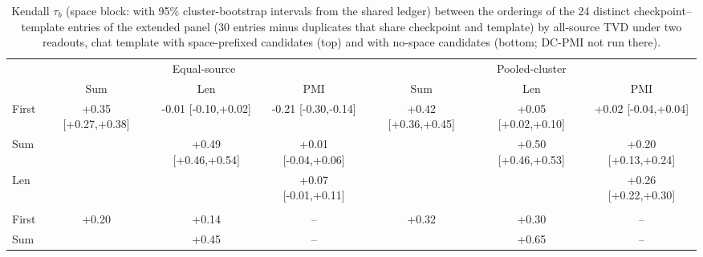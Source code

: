 \begin{table}[t]
\centering\scriptsize
\setlength{\tabcolsep}{2.5pt}
\begin{tabular}{@{}lccc@{\hspace{8pt}}ccc@{}}
\toprule
& \multicolumn{3}{c}{Equal-source} & \multicolumn{3}{c}{Pooled-cluster} \\
\cmidrule(lr){2-4}\cmidrule(l){5-7}
& Sum & Len & PMI & Sum & Len & PMI \\
\midrule
First & +0.35 [+0.27,+0.38] & -0.01 [-0.10,+0.02] & -0.21 [-0.30,-0.14] & +0.42 [+0.36,+0.45] & +0.05 [+0.02,+0.10] & +0.02 [-0.04,+0.04] \\
Sum &  & +0.49 [+0.46,+0.54] & +0.01 [-0.04,+0.06] &  & +0.50 [+0.46,+0.53] & +0.20 [+0.13,+0.24] \\
Len &  &  & +0.07 [-0.01,+0.11] &  &  & +0.26 [+0.22,+0.30] \\
\addlinespace[2pt]\multicolumn{7}{@{}l}{\emph{No-space candidates}} \\
First & +0.20 & +0.14 & -- & +0.32 & +0.30 & -- \\
Sum &  & +0.45 & -- &  & +0.65 & -- \\
\bottomrule
\end{tabular}
\caption{Kendall $\tau_b$ (space block: with 95\% cluster-bootstrap intervals from the shared ledger) between the orderings of the 24 distinct checkpoint--template entries of the extended panel (30 entries minus duplicates that share checkpoint and template) by all-source TVD under two readouts, chat template with space-prefixed candidates (top) and with no-space candidates (bottom; DC-PMI not run there).}
\label{tab:rank-stability}
\end{table}
